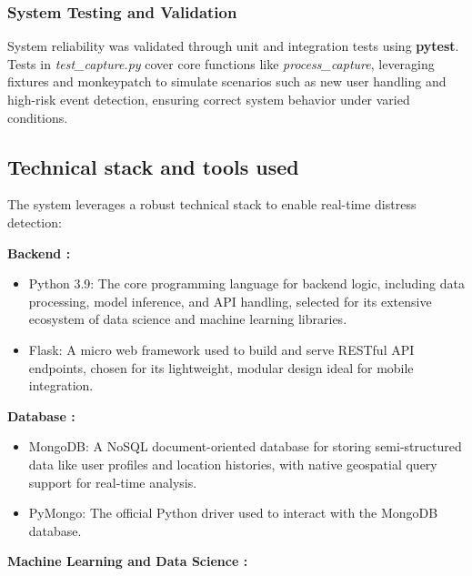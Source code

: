 \documentclass[12pt,a4paper,oneside,english]{book}
\begin{document}
\subsubsection{System Testing and Validation}
\label{subsec:system_testing}
System reliability was validated through unit and integration tests using \textbf{pytest}. Tests in \textit{test\_capture.py} cover core functions like \textit{process\_capture}, 
leveraging fixtures and monkeypatch to simulate scenarios such as new user handling and high-risk event detection, ensuring correct system behavior under varied conditions.


\subsection{Technical stack and tools used}
\label{technical}
The system leverages a robust technical stack to enable real-time distress detection:

\textbf{Backend :}
\begin{itemize}
    \item Python 3.9: The core programming language for backend logic, including data processing, model inference, and API handling, selected for its extensive ecosystem of data science and machine learning libraries.
    \item Flask: A micro web framework used to build and serve RESTful API endpoints, chosen for its lightweight, modular design ideal for mobile integration.
\end{itemize}

\textbf{Database :}
\begin{itemize}
\item MongoDB: A NoSQL document-oriented database for storing semi-structured data like user profiles and location histories, with native geospatial query support for real-time analysis.
\item PyMongo: The official Python driver used to interact with the MongoDB database.
\end{itemize}

\textbf{Machine Learning and Data Science :}
\end{document}
